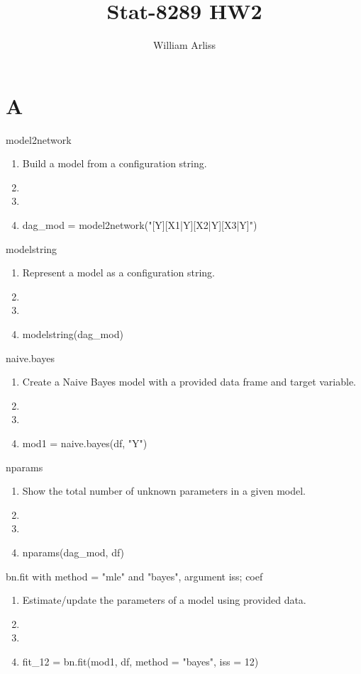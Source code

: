 \documentclass{article}
\title{Stat-8289 HW2}
\author{William Arliss}
\date{}
\begin{document}
\maketitle

\section*{A}
\label{sec:A}


model2network \begin{enumerate}[label=\alph*)]
    \item Build a model from a configuration string.
    \item 
    \item 
    \item dag\_mod = model2network("[Y][X1|Y][X2|Y][X3|Y]")
\end{enumerate}
modelstring \begin{enumerate}[label=\alph*)]
    \item Represent a model as a configuration string.
    \item 
    \item 
    \item modelstring(dag\_mod)
\end{enumerate}
naive.bayes \begin{enumerate}[label=\alph*)]
    \item Create a Naive Bayes model with a provided data frame and target variable.
    \item 
    \item 
    \item mod1 = naive.bayes(df, "Y")
\end{enumerate}
nparams \begin{enumerate}[label=\alph*)]
    \item Show the total number of unknown parameters in a given model.
    \item 
    \item 
    \item nparams(dag\_mod, df)
\end{enumerate}
bn.fit with method = "mle" and "bayes", argument iss; coef \begin{enumerate}[label=\alph*)]
    \item Estimate/update the parameters of a model using provided data.
    \item 
    \item 
    \item fit\_12 = bn.fit(mod1, df, method = "bayes", iss = 12)
\end{enumerate}
\end{document}
